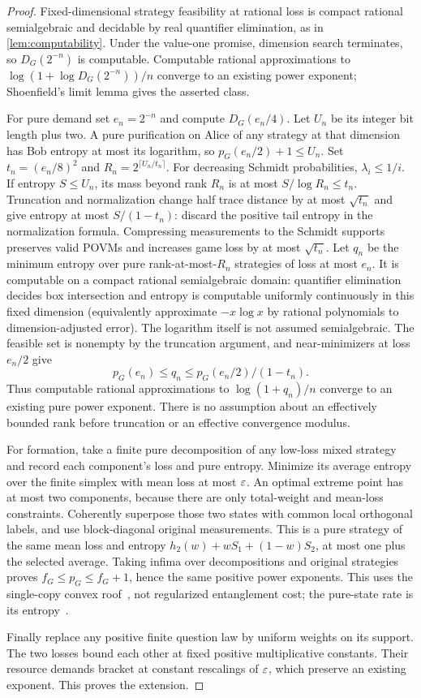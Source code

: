 \begin{proof}
Fixed-dimensional strategy feasibility at rational loss is compact rational semialgebraic and decidable by real quantifier elimination, as in \cref{lem:computability}. Under the value-one promise, dimension search terminates, so $D_G(2^{-n})$ is computable. Computable rational approximations to $\log(1+\log D_G(2^{-n}))/n$ converge to an existing power exponent; Shoenfield's limit lemma gives the asserted class.

For pure demand set $e_n=2^{-n}$ and compute $D_G(e_n/4)$. Let $U_n$ be its integer bit length plus two. A pure purification on Alice of any strategy at that dimension has Bob entropy at most its logarithm, so $p_G(e_n/2)+1\le U_n$. Set $t_n=(e_n/8)^2$ and $R_n=2^{\lceil U_n/t_n\rceil}$.
For decreasing Schmidt probabilities, $\lambda_i\le1/i$. If entropy $S\le U_n$, its mass beyond rank $R_n$ is at most $S/\log R_n\le t_n$. Truncation and normalization change half trace distance by at most $\sqrt{t_n}$ and give entropy at most $S/(1-t_n)$: discard the positive tail entropy in the normalization formula. Compressing measurements to the Schmidt supports preserves valid POVMs and increases game loss by at most $\sqrt{t_n}$.
Let $q_n$ be the minimum entropy over pure rank-at-most-$R_n$ strategies of loss at most $e_n$. It is computable on a compact rational semialgebraic domain: quantifier elimination decides box intersection and entropy is computable uniformly continuously in this fixed dimension (equivalently approximate $-x\log x$ by rational polynomials to dimension-adjusted error). The logarithm itself is not assumed semialgebraic. The feasible set is nonempty by the truncation argument, and near-minimizers at loss $e_n/2$ give
\[
 p_G(e_n)\le q_n\le p_G(e_n/2)/(1-t_n).
\]
Thus computable rational approximations to $\log(1+q_n)/n$ converge to an existing pure power exponent. There is no assumption about an effectively bounded rank before truncation or an effective convergence modulus.

For formation, take a finite pure decomposition of any low-loss mixed strategy and record each component's loss and pure entropy. Minimize its average entropy over the finite simplex with mean loss at most $\varepsilon$. An optimal extreme point has at most two components, because there are only total-weight and mean-loss constraints. Coherently superpose those two states with common local orthogonal labels, and use block-diagonal original measurements. This is a pure strategy of the same mean loss and entropy
$h_2(w)+wS_1+(1-w)S_2$, at most one plus the selected average. Taking infima over decompositions and original strategies proves $f_G\le p_G\le f_G+1$, hence the same positive power exponents. This uses the single-copy convex roof~\cite{BDSW96}, not regularized entanglement cost; the pure-state rate is its entropy~\cite{BBPS96}.

Finally replace any positive finite question law by uniform weights on its support. The two losses bound each other at fixed positive multiplicative constants. Their resource demands bracket at constant rescalings of $\varepsilon$, which preserve an existing exponent. This proves the extension.
\end{proof}

